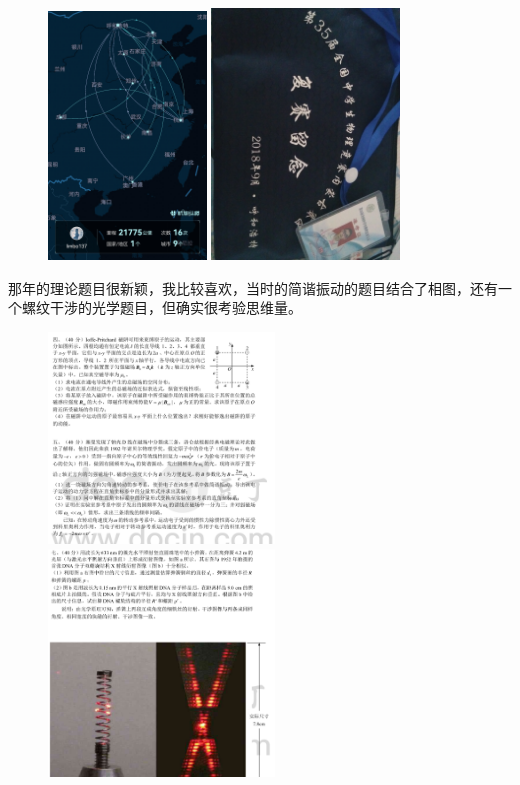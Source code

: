 \documentclass[hyperref,UTF8]{ctexart}
\begin{document}
\begin{figure}[H]
    \centering
    \includegraphics[width=4.2cm]{Screenshot_20210907_104729_com.umetrip.android.msky.app_edit_578928791734057.jpg}
    \includegraphics[width=5cm]{IMG_20180922_072940.jpg}
\end{figure}
那年的理论题目很新颖，我比较喜欢，当时的简谐振动的题目结合了相图，还有一个螺纹干涉的光学题目，但确实很考验思维量。
\begin{figure}[H]
    \centering
    \includegraphics[width=6cm]{屏幕截图 2021-09-07 110713.png}
    \includegraphics[width=6cm]{屏幕截图 2021-09-07 110937.png}
\end{figure}
\end{document}
